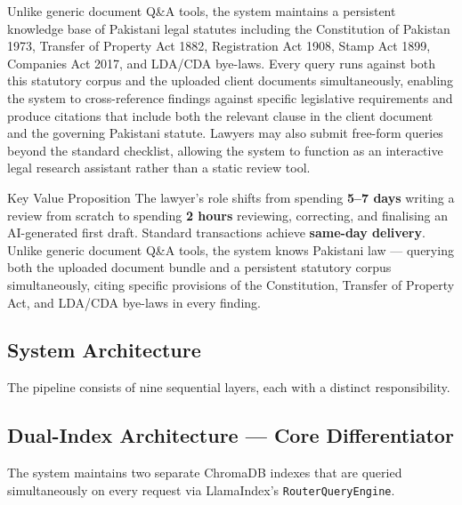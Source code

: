 \documentclass[12pt, a4paper]{article}
\begin{document}
Unlike generic document Q\&A tools, the system maintains a persistent knowledge
base of Pakistani legal statutes including the Constitution of Pakistan 1973,
Transfer of Property Act 1882, Registration Act 1908, Stamp Act 1899, Companies
Act 2017, and LDA/CDA bye-laws. Every query runs against both this statutory
corpus and the uploaded client documents simultaneously, enabling the system to
cross-reference findings against specific legislative requirements and produce
citations that include both the relevant clause in the client document and the
governing Pakistani statute. Lawyers may also submit free-form queries beyond
the standard checklist, allowing the system to function as an interactive legal
research assistant rather than a static review tool.

\begin{successbox}{Key Value Proposition}
The lawyer's role shifts from spending \textbf{5--7 days} writing a review from
scratch to spending \textbf{2 hours} reviewing, correcting, and finalising an
AI-generated first draft. Standard transactions achieve \textbf{same-day delivery}.
Unlike generic document Q\&A tools, the system knows Pakistani law --- querying
both the uploaded document bundle and a persistent statutory corpus simultaneously,
citing specific provisions of the Constitution, Transfer of Property Act, and
LDA/CDA bye-laws in every finding.
\end{successbox}

\subsection{System Architecture}

The pipeline consists of nine sequential layers, each with a distinct
responsibility.

\subsection{Dual-Index Architecture --- Core Differentiator}

The system maintains two separate ChromaDB indexes that are queried simultaneously
on every request via LlamaIndex's \texttt{RouterQueryEngine}.
\end{document}
